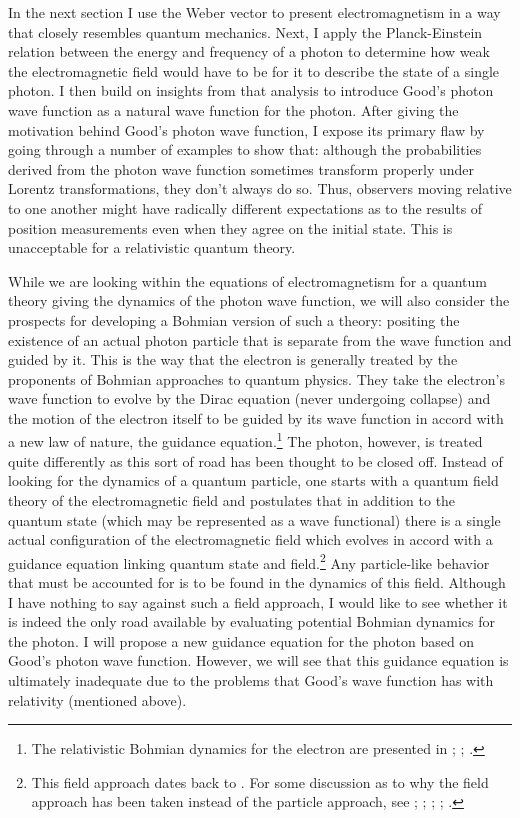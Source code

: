 \documentclass[12pt,secnumarabic,amsmath,amssymb,balancelastpage,nofootinbib]{article}
\begin{document}
In the next section I use the Weber vector to present electromagnetism in a way that closely resembles quantum mechanics.  Next, I apply the Planck-Einstein relation between the energy and frequency of a photon to determine how weak the electromagnetic field would have to be for it to describe the state of a single photon.  I then build on insights from that analysis to introduce Good's photon wave function as a natural wave function for the photon.  After giving the motivation behind Good's photon wave function, I expose its primary flaw by going through a number of examples to show that: although the probabilities derived from the photon wave function sometimes transform properly under Lorentz transformations, they don't always do so.  Thus, observers moving relative to one another might have radically different expectations as to the results of position measurements even when they agree on the initial state.  This is unacceptable for a relativistic quantum theory.


While we are looking within the equations of electromagnetism for a quantum theory giving the dynamics of the photon wave function, we will also consider the prospects for developing a Bohmian version of such a theory: positing the existence of an actual photon particle that is separate from the wave function and guided by it.  This is the way that the electron is generally treated by the proponents of Bohmian approaches to quantum physics.  They take the electron's wave function to evolve by the Dirac equation (never undergoing collapse) and the motion of the electron itself to be guided by its wave function in accord with a new law of nature, the guidance equation.\footnote{The relativistic Bohmian dynamics for the electron are presented in \citet{bohm1953}; \citet[sec.\ 12.2]{bohmhiley}; \citet[sec.\ 12.2]{holland}.} The photon, however, is treated quite differently as this sort of road has been thought to be closed off.  Instead of looking for the dynamics of a quantum particle, one starts with a quantum field theory of the electromagnetic field and postulates that in addition to the quantum state (which may be represented as a wave functional) there is a single actual configuration of the electromagnetic field which evolves in accord with a guidance equation linking quantum state and field.\footnote{This field approach dates back to \citet{bohm1952pt2}.  For some discussion as to why the field approach has been taken instead of the particle approach, see \citet[ch.\ 11]{bohmhiley}; \citet{holland1993}; \citet[sec.\ 12.6]{holland}; \citet{struyve2011}; \citet{flack2016}.}  Any particle-like behavior that must be accounted for is to be found in the dynamics of this field.  Although I have nothing to say against such a field approach, I would like to see whether it is indeed the only road available by evaluating potential Bohmian dynamics for the photon.  I will propose a new guidance equation for the photon based on Good's photon wave function.  However, we will see that this guidance equation is ultimately inadequate due to the problems that Good's wave function has with relativity (mentioned above).
\end{document}
